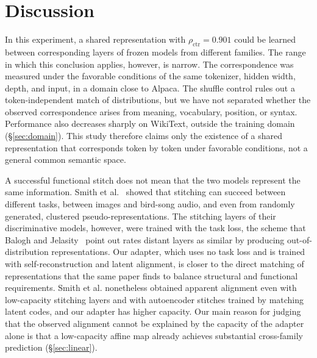 \documentclass[conference]{IEEEtran}
\begin{document}
\section{Discussion}\label{sec:discussion}
In this experiment, a shared representation with $\rho_{\mathrm{ctr}}\!=\!0.901$ could be learned between corresponding layers of frozen
models from different families. The range in which this conclusion applies, however, is narrow. The correspondence was measured under
the favorable conditions of the same tokenizer, hidden width, depth, and input, in a domain close to Alpaca. The shuffle control rules out a
token-independent match of distributions, but we have not separated whether the observed correspondence arises from meaning, vocabulary,
position, or syntax. Performance also decreases sharply on WikiText, outside the training domain (\S\ref{sec:domain}).
This study therefore claims only the existence of a shared representation that corresponds token by token under favorable conditions,
not a general common semantic space.

A successful functional stitch does not mean that the two models represent the same information. Smith et al.~\cite{pmlr-v267-smith25a}
showed that stitching can succeed between different tasks, between images and bird-song audio, and
even from randomly generated, clustered pseudo-representations. The stitching layers of their discriminative models, however, were
trained with the task loss, the scheme that Balogh and Jelasity~\cite{balogh2025not} point out rates distant layers as similar by
producing out-of-distribution representations. Our adapter, which uses no task loss and is trained with self-reconstruction and latent
alignment, is closer to the direct matching of representations that the same paper finds to balance structural and functional
requirements. Smith et al. nonetheless obtained apparent alignment even with low-capacity stitching layers and with autoencoder stitches
trained by matching latent codes, and our adapter has higher capacity. Our main reason for judging that the observed
alignment cannot be explained by the capacity of the adapter alone is that a low-capacity affine map already achieves substantial
cross-family prediction (\S\ref{sec:linear}).
\end{document}
